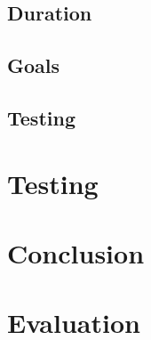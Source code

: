 \documentclass[10pt,a4paper,oneside]{report}
\begin{document}
\section{Duration}
\section{Goals}
\section{Testing}

\chapter{Testing}

\chapter{Conclusion}

\chapter{Evaluation}
\end{document}
